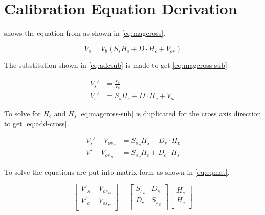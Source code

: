 
\chapter{Calibration Equation Derivation}

\label{ch:mag-deriv}

 shows the equation from \cite{AN215} as shown in \cref{eq:magcross}.

\begin{equation}
    V_s = V_b \left(S_s H_s + D \cdot H_c + V_{os} \right)
    \label{eq:magcross2}
\end{equation}

The substitution shown in \cref{eq:adcsub} is made to get \cref{eq:magcross-sub}

\begin{align}
    V_s' & =\frac{V_s}{V_b}\\
    V_s' & = S_s H_s + D \cdot H_c + V_{os}
    \label{eq:magcross-sub}
\end{align}

To solve for $H_c$ and $H_s$ \cref{eq:magcross-sub} is duplicated for the cross axis direction to get \cref{eq:add-cross}.

\begin{equation}
    \begin{aligned}
        V_s' - {V_{os}}_s &=  {S_s}_s H_s  + D_s \cdot H_c\\
        V' - {V_{os}}_s &=  {S_s}_c H_c  + D_c \cdot H_s
    \end{aligned}
    \label{eq:add-cross}
\end{equation}

To solve the equations are put into matrix form as shown in \cref{eq:eqmat}.

\begin{equation}
    \begin{bmatrix}
        V'_s - {V_{os}}_s\\
        V'_c - {V_{os}}_c\\
    \end{bmatrix} =
    \begin{bmatrix}
        {S_s}_s & D_s \\
        D_c & {S_s}_c \\
    \end{bmatrix}
    \begin{bmatrix}
        H_s\\
        H_c\\
    \end{bmatrix}
    \label{eq:eqmat}
\end{equation}

